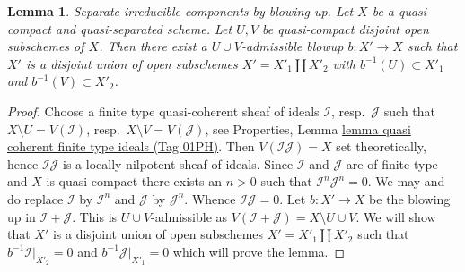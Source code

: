 \documentclass{amsart}
\newenvironment{slogan}{\comment}{\endcomment}
\theoremstyle{plain}
\newtheorem{lemma}[subsection]{Lemma}
\theoremstyle{definition}
\theoremstyle{remark}
\numberwithin{equation}{subsection}
\begin{document}
\begin{lemma}
\label{divisors-lemma-separate-disjoint-opens-by-blowing-up}
\begin{slogan}
Separate irreducible components by blowing up.
\end{slogan}
Let $X$ be a quasi-compact and quasi-separated scheme.
Let $U, V$ be quasi-compact disjoint open subschemes of $X$.
Then there exist a $U \cup V$-admissible blowup $b : X' \to X$
such that $X'$ is a disjoint union of open subschemes
$X' = X'_1 \amalg X'_2$ with $b^{-1}(U) \subset X'_1$ and
$b^{-1}(V) \subset X'_2$.
\end{lemma}

\begin{proof}
Choose a finite type quasi-coherent sheaf of ideals $\mathcal{I}$,
resp.\ $\mathcal{J}$ such that $X \setminus U = V(\mathcal{I})$,
resp.\ $X \setminus V = V(\mathcal{J})$, see
Properties, Lemma \href{https://stacks.math.columbia.edu/tag/01PH}{lemma quasi coherent finite type ideals (Tag 01PH)}.
Then $V(\mathcal{I}\mathcal{J}) = X$ set theoretically, hence
$\mathcal{I}\mathcal{J}$ is a locally nilpotent sheaf of ideals.
Since $\mathcal{I}$ and $\mathcal{J}$ are of finite type and $X$
is quasi-compact there exists an $n > 0$ such that
$\mathcal{I}^n \mathcal{J}^n = 0$. We may and do replace $\mathcal{I}$
by $\mathcal{I}^n$ and $\mathcal{J}$ by $\mathcal{J}^n$. Whence
$\mathcal{I} \mathcal{J} = 0$. Let $b : X' \to X$ be the blowing
up in $\mathcal{I} + \mathcal{J}$. This is $U \cup V$-admissible
as $V(\mathcal{I} + \mathcal{J}) = X \setminus U \cup V$. We will show that
$X'$ is a disjoint union of open subschemes $X' = X'_1 \amalg X'_2$
such that $b^{-1}\mathcal{I}|_{X'_2} = 0$ and $b^{-1}\mathcal{J}|_{X'_1} = 0$
which will prove the lemma.


\end{proof}
\end{document}
